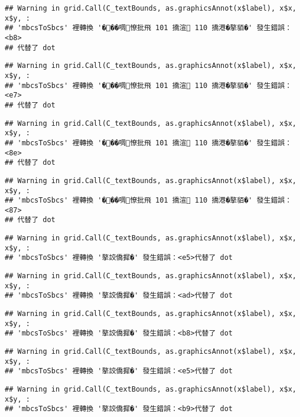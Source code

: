 \documentclass[
]{article}
\begin{document}
\begin{verbatim}
## Warning in grid.Call(C_textBounds, as.graphicsAnnot(x$label), x$x, x$y, :
## 'mbcsToSbcs' 裡轉換 '���啁憭批飛 101 撟渲 110 撟港�摮貊�' 發生錯誤：<b8>
## 代替了 dot
\end{verbatim}

\begin{verbatim}
## Warning in grid.Call(C_textBounds, as.graphicsAnnot(x$label), x$x, x$y, :
## 'mbcsToSbcs' 裡轉換 '���啁憭批飛 101 撟渲 110 撟港�摮貊�' 發生錯誤：<e7>
## 代替了 dot
\end{verbatim}

\begin{verbatim}
## Warning in grid.Call(C_textBounds, as.graphicsAnnot(x$label), x$x, x$y, :
## 'mbcsToSbcs' 裡轉換 '���啁憭批飛 101 撟渲 110 撟港�摮貊�' 發生錯誤：<8e>
## 代替了 dot
\end{verbatim}

\begin{verbatim}
## Warning in grid.Call(C_textBounds, as.graphicsAnnot(x$label), x$x, x$y, :
## 'mbcsToSbcs' 裡轉換 '���啁憭批飛 101 撟渲 110 撟港�摮貊�' 發生錯誤：<87>
## 代替了 dot
\end{verbatim}

\begin{verbatim}
## Warning in grid.Call(C_textBounds, as.graphicsAnnot(x$label), x$x, x$y, :
## 'mbcsToSbcs' 裡轉換 '摮詨僑摨�' 發生錯誤：<e5>代替了 dot
\end{verbatim}

\begin{verbatim}
## Warning in grid.Call(C_textBounds, as.graphicsAnnot(x$label), x$x, x$y, :
## 'mbcsToSbcs' 裡轉換 '摮詨僑摨�' 發生錯誤：<ad>代替了 dot
\end{verbatim}

\begin{verbatim}
## Warning in grid.Call(C_textBounds, as.graphicsAnnot(x$label), x$x, x$y, :
## 'mbcsToSbcs' 裡轉換 '摮詨僑摨�' 發生錯誤：<b8>代替了 dot
\end{verbatim}

\begin{verbatim}
## Warning in grid.Call(C_textBounds, as.graphicsAnnot(x$label), x$x, x$y, :
## 'mbcsToSbcs' 裡轉換 '摮詨僑摨�' 發生錯誤：<e5>代替了 dot
\end{verbatim}

\begin{verbatim}
## Warning in grid.Call(C_textBounds, as.graphicsAnnot(x$label), x$x, x$y, :
## 'mbcsToSbcs' 裡轉換 '摮詨僑摨�' 發生錯誤：<b9>代替了 dot
\end{verbatim}
\end{document}
